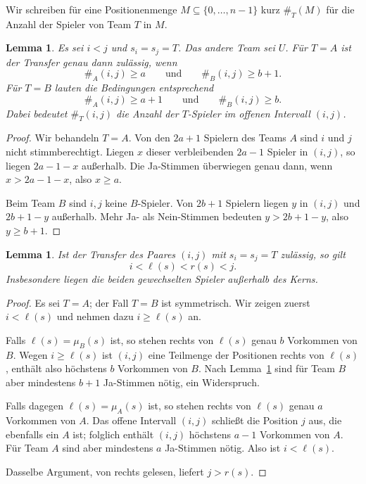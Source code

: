 \documentclass[11pt,a4paper]{article}
\newtheorem{lemma}[theorem]{Lemma}
\begin{document}
Wir schreiben f\"ur eine Positionenmenge $M\subseteq\{0,\dots,n-1\}$
kurz $\#_T(M)$ f\"ur die Anzahl der Spieler von Team $T$ in $M$.

\begin{lemma}
\label{lem:votes}
Es sei $i<j$ und $s_i=s_j=T$.  Das andere Team sei $U$.  F\"ur
$T=A$ ist der Transfer genau dann zul\"assig, wenn
\[
\#_A(i,j)\ge a
\qquad\text{und}\qquad
\#_B(i,j)\ge b+1.
\]
F\"ur $T=B$ lauten die Bedingungen entsprechend
\[
\#_A(i,j)\ge a+1
\qquad\text{und}\qquad
\#_B(i,j)\ge b.
\]
Dabei bedeutet $\#_T(i,j)$ die Anzahl der $T$-Spieler im offenen
Intervall $(i,j)$.
\end{lemma}

\begin{proof}
Wir behandeln $T=A$.  Von den $2a+1$ Spielern des Teams $A$ sind $i$
und $j$ nicht stimmberechtigt.  Liegen $x$ dieser verbleibenden
$2a-1$ Spieler in $(i,j)$, so liegen $2a-1-x$ au\ss erhalb.  Die
Ja-Stimmen \"uberwiegen genau dann, wenn $x>2a-1-x$, also
$x\ge a$.

Beim Team $B$ sind $i,j$ keine $B$-Spieler.  Von $2b+1$ Spielern
liegen $y$ in $(i,j)$ und $2b+1-y$ au\ss erhalb.  Mehr Ja- als
Nein-Stimmen bedeuten $y>2b+1-y$, also $y\ge b+1$.
\end{proof}

\begin{lemma}
\label{lem:straddle}
Ist der Transfer des Paares $(i,j)$ mit $s_i=s_j=T$ zul\"assig, so
gilt
\[
i<\ell(s)<r(s)<j.
\]
Insbesondere liegen die beiden gewechselten Spieler au\ss erhalb des
Kerns.
\end{lemma}

\begin{proof}
Es sei $T=A$; der Fall $T=B$ ist symmetrisch.  Wir zeigen zuerst
$i<\ell(s)$ und nehmen dazu $i\ge\ell(s)$ an.

Falls $\ell(s)=\mu_B(s)$ ist, so stehen rechts von $\ell(s)$ genau
$b$ Vorkommen von $B$.  Wegen $i\ge\ell(s)$ ist $(i,j)$ eine
Teilmenge der Positionen rechts von $\ell(s)$, enth\"alt also
h\"ochstens $b$ Vorkommen von $B$.  Nach
Lemma~\ref{lem:votes} sind f\"ur Team $B$ aber mindestens $b+1$
Ja-Stimmen n\"otig, ein Widerspruch.

Falls dagegen $\ell(s)=\mu_A(s)$ ist, so stehen rechts von
$\ell(s)$ genau $a$ Vorkommen von $A$.  Das offene Intervall
$(i,j)$ schlie\ss t die Position $j$ aus, die ebenfalls ein $A$ ist;
folglich enth\"alt $(i,j)$ h\"ochstens $a-1$ Vorkommen von $A$.  F\"ur
Team $A$ sind aber mindestens $a$ Ja-Stimmen n\"otig.  Also ist
$i<\ell(s)$.

Dasselbe Argument, von rechts gelesen, liefert $j>r(s)$.
\end{proof}
\end{document}
